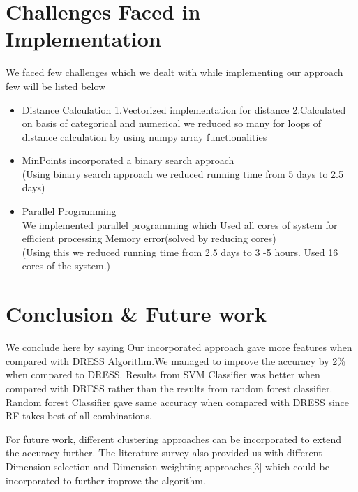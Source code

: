 \documentclass[10pt, conference, compsocconf]{IEEEtran}
\begin{document}
\section{Challenges Faced in Implementation}
We faced few challenges which we dealt with while implementing our approach
few will be listed below
\begin{itemize}
\item Distance Calculation
 \subitem 1.Vectorized implementation for distance
 \subitem 2.Calculated on basis of categorical and numerical 
we reduced so many for loops of distance 
calculation by using numpy array functionalities

\item MinPoints
\subitem incorporated a binary search approach\\
(Using binary search approach we reduced running time from 5 days to 2.5 days)

\item Parallel Programming\\
We implemented parallel programming which 
\subitem Used all cores of system for efficient processing
\subitem Memory error(solved by reducing cores)\\
(Using this we reduced running time from 2.5 days to 3
-5 hours. Used 16 cores of the system.)
\end{itemize}

\section{Conclusion \& Future work}
We conclude here by saying Our incorporated approach gave more features when compared 
with DRESS Algorithm.We managed to improve the accuracy by 2\% when compared to DRESS.
Results from SVM Classifier was better when compared with DRESS rather than the results from random forest classifier.
Random forest Classifier gave same accuracy when compared with DRESS since RF takes best of all combinations.

For future work, different clustering approaches can be incorporated to extend the accuracy further.
The literature survey also provided us with different Dimension selection and Dimension 
weighting approaches[3] which could be incorporated to further improve the algorithm. 
  


\end{document}
